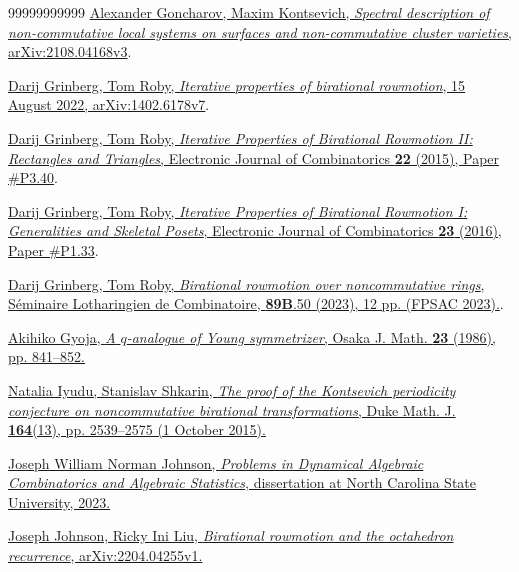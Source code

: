 \documentclass[numbers=enddot,12pt,final,onecolumn,notitlepage]{scrartcl}%
\theoremstyle{definition}
\begin{document}
\begin{thebibliography}{99999999999}
%
\href{https://arxiv.org/abs/2108.04168v3}{Alexander Goncharov, Maxim
Kontsevich, \textit{Spectral description of non-commutative local systems on
surfaces and non-commutative cluster varieties}, arXiv:2108.04168v3}.

%
\href{https://arxiv.org/abs/1402.6178v7}{Darij Grinberg, Tom Roby,
\textit{Iterative properties of birational rowmotion}, 15 August 2022,
arXiv:1402.6178v7}.

\href{https://doi.org/10.37236/4335}{Darij
Grinberg, Tom Roby, \textit{Iterative Properties of Birational Rowmotion II:
Rectangles and Triangles}, Electronic Journal of Combinatorics \textbf{22}
(2015), Paper \#P3.40}.

\href{https://doi.org/10.37236/4334}{Darij
Grinberg, Tom Roby, \textit{Iterative Properties of Birational Rowmotion I:
Generalities and Skeletal Posets}, Electronic Journal of Combinatorics
\textbf{23} (2016), Paper \#P1.33}.

%
\href{https://www.cip.ifi.lmu.de/~grinberg/algebra/fps2023.pdf}{Darij
Grinberg, Tom Roby, \textit{Birational rowmotion over noncommutative rings},
S\'{e}minaire Lotharingien de Combinatoire, \textbf{89B}.50 (2023), 12 pp.
(FPSAC 2023).}.

%
\href{https://projecteuclid.org/journals/osaka-journal-of-mathematics/volume-23/issue-4/A-q-analogue-of-Young-symmetrizer/ojm/1200779724.full}{Akihiko
Gyoja, \textit{A }$\mathit{q}$\textit{-analogue of Young symmetrizer}, Osaka
J. Math. \textbf{23} (1986), pp. 841--852.}

%
\href{http://dx.doi.org/10.1215/00127094-3146603}{Natalia Iyudu, Stanislav
Shkarin, \textit{The proof of the Kontsevich periodicity conjecture on
noncommutative birational transformations}, Duke Math. J. \textbf{164}(13),
pp. 2539--2575 (1 October 2015).}

%
\href{https://www.lib.ncsu.edu/resolver/1840.20/40802}{Joseph William Norman
Johnson, \textit{Problems in Dynamical Algebraic Combinatorics and Algebraic
Statistics}, dissertation at North Carolina State University, 2023.}

\href{https://arxiv.org/abs/2204.04255v1}{Joseph
Johnson, Ricky Ini Liu, \textit{Birational rowmotion and the octahedron
recurrence}, arXiv:2204.04255v1.}


\end{thebibliography}
\end{document}
